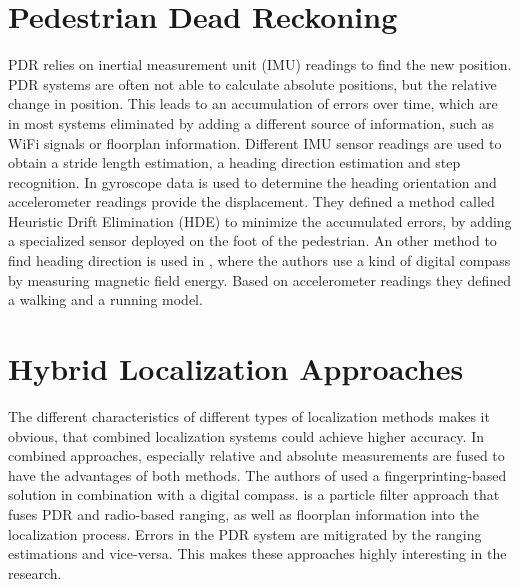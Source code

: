 \section{Pedestrian Dead Reckoning}
PDR relies on inertial measurement unit (IMU) readings to find the new position. PDR systems are often not able to calculate absolute positions, but the relative change in position. This leads to an accumulation of errors over time, which are in most systems eliminated by adding a different source of information, such as WiFi signals or floorplan information. Different IMU sensor readings are used to obtain a stride length estimation, a heading direction estimation and step recognition. In \cite{Borestein} gyroscope data is used to determine the heading orientation and accelerometer readings provide the displacement. They defined a method called Heuristic Drift Elimination (HDE) to minimize the accumulated errors, by adding a specialized sensor deployed on the foot of the pedestrian. An other method to find heading direction is used in \cite{Kakiuchi}, where the authors use a kind of digital compass by measuring magnetic field energy. Based on accelerometer readings they defined a walking and a running model.

\section{Hybrid Localization Approaches}
The different characteristics of different types of localization methods makes it obvious, that combined localization systems could achieve higher accuracy. In combined approaches, especially relative and absolute measurements are fused to have the advantages of both methods. The authors of \cite{Nagpal} used a fingerprinting-based solution in combination with a digital compass. \cite{Carrera} is a particle filter approach that fuses PDR and radio-based ranging, as well as floorplan information into the localization process. Errors in the PDR system are mitigrated by the ranging estimations and vice-versa. This makes these approaches highly interesting in the research.
